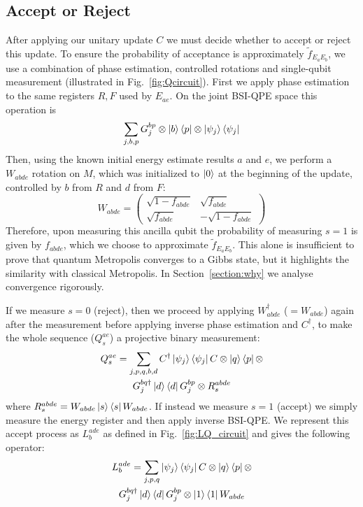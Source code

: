 \documentclass[aps,floatfix,10pt,amssymb,amsfont,amsmath,superscriptaddress,float,nofootinbib,longbibliography,nobalancelastpage,twocolumn]{revtex4-2}
\begin{document}
\subsection{Accept or Reject}
\label{section:acceptprob}
After applying our unitary update $C$ we must decide whether to accept or reject this update. To ensure the probability of acceptance is approximately $\tilde{f}_{E_aE_b}$, we use a combination of phase estimation, controlled rotations and single-qubit measurement (illustrated in Fig.~\ref{fig:Qcircuit}). First we apply phase estimation to the same registers $R, F$ used by $E_{ae}$. On the joint BSI-QPE space this operation is
\begin{equation}
  \sum_{j,b,p}G_j^{bp}\otimes\ket{b}\bra{p}\otimes\ket{\psi_j}\bra{\psi_j}
\end{equation}
Then, using the known initial energy estimate results $a$ and $e$, we perform a $W_{abde}$ rotation on $M$, which was initialized to $\ket{0}$ at the beginning of the update, controlled by $b$ from $R$ and $d$ from $F$:
\begin{equation}
    W_{abde} = \begin{pmatrix}
        \sqrt{1 - f_{abde}} & \sqrt{f_{abde}}\\
       \sqrt{f_{abde}} & -\sqrt{1 - f_{abde}}
    \end{pmatrix}
\end{equation}
Therefore, upon measuring this ancilla qubit the probability of measuring $s=1$ is given by $f_{abde}$, which we choose to approximate $\tilde f_{E_aE_b}$. This alone is insufficient to prove that quantum Metropolis converges to a Gibbs state, but it highlights the similarity with classical Metropolis. In Section~\ref{section:why} we analyse convergence rigorously.

If we measure $s=0$ (reject), then we proceed by applying $W_{abde}^{\dagger}$ ($=W_{abde}$) again after the measurement before applying inverse phase estimation and $C^{\dagger}$, to make the whole sequence ($Q_s^{ae}$) a projective binary measurement:
\begin{multline} 
    Q_s^{ae} = \sum_{j,p,q,b,d}  C^{\dagger}\ket{\psi_j}\bra{\psi_j}C \otimes \ket{q}\bra{p} \otimes\\ G_j^{bq\dagger}\ket{d}\bra{d}G_j^{bp}\otimes R^{abde}_s
\end{multline}
where $R^{abde}_s = W_{abde}\ket{s}\bra{s}W_{abde}$. If instead we measure $s=1$ (accept) we simply measure the energy register and then apply inverse BSI-QPE. We represent this accept process as $L^{ade}_b$ as defined in Fig.~\ref{fig:LQ_circuit} and gives the following operator:
\begin{multline}
    L^{ade}_b =\sum_{j,p,q}\ket{\psi_j}\bra{\psi_j}C \otimes \ket{q}\bra{p} \otimes\\ G^{bq\dagger}_j \ket{d}\bra{d}G^{bp}_j \otimes \ket{1}\bra{1}W_{abde}
\end{multline}
\end{document}
